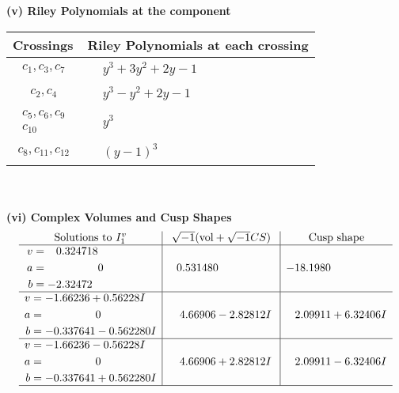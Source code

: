 \documentclass[1p]{elsarticle_modified}
\theoremstyle{definition}
\newcommand{\I}{\sqrt{-1}}
\begin{document}
\newpage\renewcommand{\arraystretch}{1}
\flushleft \textbf{(v) Riley Polynomials at the component}\newline \\
\begin{tabular}{m{50pt}|m{274pt}}
Crossings & \hspace{64pt}Riley Polynomials at each crossing \\
\hline $$\begin{aligned}c_{1},c_{3},c_{7}\end{aligned}$$&$\begin{aligned}
&y^3+3 y^2+2 y-1
\end{aligned}$\\
\hline $$\begin{aligned}c_{2},c_{4}\end{aligned}$$&$\begin{aligned}
&y^3- y^2+2 y-1
\end{aligned}$\\
\hline $$\begin{aligned}c_{5},c_{6},c_{9}\\c_{10}\end{aligned}$$&$\begin{aligned}
&y^3
\end{aligned}$\\
\hline $$\begin{aligned}c_{8},c_{11},c_{12}\end{aligned}$$&$\begin{aligned}
&(y-1)^3
\end{aligned}$\\
\hline
\end{tabular}\\~\\
\newpage\flushleft \textbf{(vi) Complex Volumes and Cusp Shapes}
$$\begin{array}{c|c|c}  
\text{Solutions to }I^v_{1}& \I (\text{vol} + \sqrt{-1}CS) & \text{Cusp shape}\\
 \hline 
\begin{aligned}
v &= \phantom{-}0.324718\phantom{ +0.000000I} \\
a &= \phantom{-0.000000 } 0 \\
b &= -2.32472\phantom{ +0.000000I}\end{aligned}
 & \phantom{-}0.531480\phantom{ +0.000000I} & -18.1980\phantom{ +0.000000I} \\ \hline\begin{aligned}
v &= -1.66236 + 0.56228 I \\
a &= \phantom{-0.000000 } 0 \\
b &= -0.337641 - 0.562280 I\end{aligned}
 & \phantom{-}4.66906 - 2.82812 I & \phantom{-}2.09911 + 6.32406 I \\ \hline\begin{aligned}
v &= -1.66236 - 0.56228 I \\
a &= \phantom{-0.000000 } 0 \\
b &= -0.337641 + 0.562280 I\end{aligned}
 & \phantom{-}4.66906 + 2.82812 I & \phantom{-}2.09911 - 6.32406 I\\
 \hline 
 \end{array}$$\newpage
\end{document}
